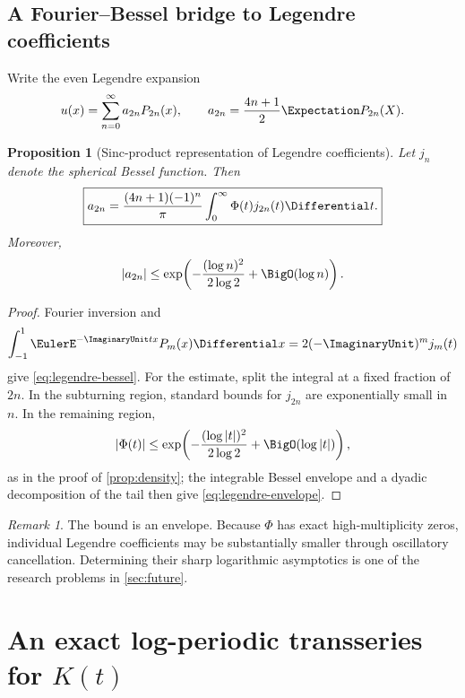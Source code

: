 \documentclass[11pt,oneside]{article}
\newtheorem{proposition}[theorem]{Proposition}
\theoremstyle{definition}
\theoremstyle{remark}
\newtheorem{remark}[theorem]{Remark}
\begin{document}
\subsection{A Fourier--Bessel bridge to Legendre coefficients}

Write the even Legendre expansion
\begin{equation}
 u(x)=\sum_{n=0}^{\infty}a_{2n}P_{2n}(x),
 \qquad
 a_{2n}=\frac{4n+1}{2}\Expectation P_{2n}(X).
 \label{eq:Legendre}
\end{equation}

\begin{proposition}[Sinc-product representation of Legendre coefficients]
\label{prop:legendre-bessel}
Let \(j_n\) denote the spherical Bessel function.  Then
\begin{equation}
 \boxed{\displaystyle
 a_{2n}
 =\frac{(4n+1)(-1)^n}{\pi}
   \int_0^\infty \Phi(t)j_{2n}(t)\Differential t.}
 \label{eq:legendre-bessel}
\end{equation}
Moreover,
\begin{equation}
 |a_{2n}|
 \leq
 \exp\!\left(
  -\frac{(\log n)^2}{2\log2}+\BigO(\log n)
 \right).
 \label{eq:legendre-envelope}
\end{equation}
\end{proposition}

\begin{proof}
Fourier inversion and
\[
 \int_{-1}^{1}\EulerE^{-\ImaginaryUnit tx}P_m(x)\Differential x
 =2(-\ImaginaryUnit)^m j_m(t)
\]
give \eqref{eq:legendre-bessel}.  For the estimate, split the integral at a
fixed fraction of \(2n\).  In the subturning region, standard bounds for
\(j_{2n}\) are exponentially small in \(n\).  In the remaining region,
\[
 |\Phi(t)|
 \leq
 \exp\!\left(
  -\frac{(\log|t|)^2}{2\log2}+\BigO(\log|t|)
 \right),
\]
as in the proof of \cref{prop:density}; the integrable Bessel envelope and a
dyadic decomposition of the tail then give \eqref{eq:legendre-envelope}.
\end{proof}

\begin{remark}
The bound is an envelope.  Because \(\Phi\) has exact high-multiplicity zeros,
individual Legendre coefficients may be substantially smaller through
oscillatory cancellation.  Determining their sharp logarithmic asymptotics is
one of the research problems in \cref{sec:future}.
\end{remark}

\section{An exact log-periodic transseries for \(K(t)\)}
\end{document}
